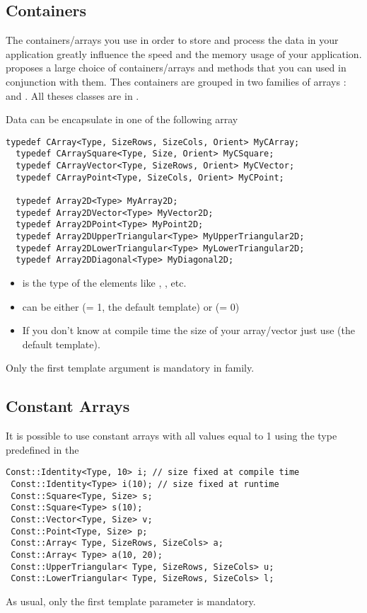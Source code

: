 \documentclass[a4paper,10pt]{article}
\begin{document}
\subsection{Containers}

The containers/arrays you use in order to store and process the data in your
application greatly influence the speed and the memory usage of your application.
\stkpp{} proposes a large choice of containers/arrays and methods that you can
used in conjunction with them. Thes containers are grouped in two families of
arrays : \CArray{} and \ArrayTwoD{}. All theses classes are in .

Data can be encapsulate in one of the following array
\begin{lstlisting}[style=customcpp]
  typedef CArray<Type, SizeRows, SizeCols, Orient> MyCArray;
  typedef CArraySquare<Type, Size, Orient> MyCSquare;
  typedef CArrayVector<Type, SizeRows, Orient> MyCVector;
  typedef CArrayPoint<Type, SizeCols, Orient> MyCPoint;

  typedef Array2D<Type> MyArray2D;
  typedef Array2DVector<Type> MyVector2D;
  typedef Array2DPoint<Type> MyPoint2D;
  typedef Array2DUpperTriangular<Type> MyUpperTriangular2D;
  typedef Array2DLowerTriangular<Type> MyLowerTriangular2D;
  typedef Array2DDiagonal<Type> MyDiagonal2D;
\end{lstlisting}

\begin{itemize}
\item {} is the type of the elements like , , etc.
\item {} can be either 
 (= 1, the default template) or  (= 0)
\item If you don't know at compile time the size of your array/vector just use
 (the default template).
\end{itemize}
\begin{note}
Only the first template argument is mandatory in  family.
\end{note}


\subsection{Constant Arrays}
It is possible to use constant arrays with all values equal to 1 using
the type predefined in the 
\begin{lstlisting}[style=customcpp]
 Const::Identity<Type, 10> i; // size fixed at compile time
 Const::Identity<Type> i(10); // size fixed at runtime
 Const::Square<Type, Size> s;
 Const::Square<Type> s(10);
 Const::Vector<Type, Size> v;
 Const::Point<Type, Size> p;
 Const::Array< Type, SizeRows, SizeCols> a;
 Const::Array< Type> a(10, 20);
 Const::UpperTriangular< Type, SizeRows, SizeCols> u;
 Const::LowerTriangular< Type, SizeRows, SizeCols> l;
\end{lstlisting}
As usual, only the first template parameter is mandatory.
\end{document}
